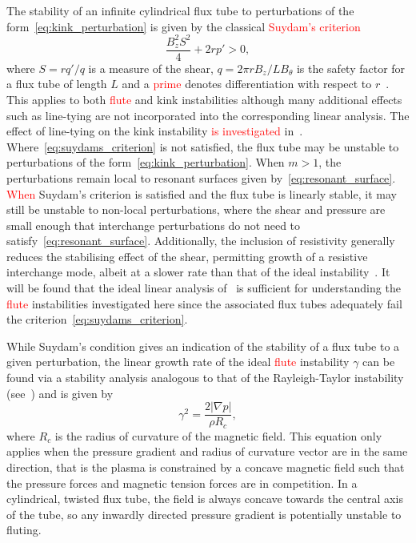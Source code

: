 \documentclass[12pt]{article}
\newcommand{\rs}[2]{\textcolor{red}{#2}}
\begin{document}
The stability of an infinite cylindrical flux tube to perturbations of
the form~\eqref{eq:kink_perturbation} is given by the classical
\rs{}{Suydam's criterion \cite{suydamStabilityLinearPinch1958}}
\begin{equation}
  \label{eq:suydams_criterion}
\frac{B_z^2 S^2}{4} + 2 r p' > 0,
\end{equation}
where $S = r q'/q$ is a measure of the shear, $q = 2\pi r B_z / L
B_{\theta}$ is the safety factor for a flux tube of length $L$ and a
\rs{dash}{prime} denotes differentiation with respect to
$r$~\cite{mikhailovskiiInstabilitiesConfinedPlasma1998}. This applies
to both \rs{fluting}{flute} and kink instabilities although many
additional effects such as line-tying are not incorporated into the
corresponding linear analysis. The effect of line-tying on the kink
instability \rs{can be found}{is investigated}
in~\cite{hoodKinkInstabilitySolar1979}. Where~\eqref{eq:suydams_criterion}
is not satisfied, the flux tube may be unstable to perturbations of
the form~\eqref{eq:kink_perturbation}. When $m>1$, the perturbations
remain local to resonant surfaces given
by~\eqref{eq:resonant_surface}. 
\rs{}{When} Suydam's criterion is satisfied and the flux tube is linearly stable, it may still be unstable to non-local perturbations, where the shear and pressure are small enough that interchange perturbations do not need to satisfy~\eqref{eq:resonant_surface}. Additionally, the inclusion of resistivity generally reduces the stabilising effect of the shear, permitting growth of a resistive interchange mode, albeit at a slower rate than that of the ideal instability~\cite{mikhailovskiiInstabilitiesConfinedPlasma1998}. It will be found that the ideal linear analysis of~\cite{mikhailovskiiInstabilitiesConfinedPlasma1998} is sufficient for understanding the \rs{fluting}{flute} instabilities investigated here since the associated flux tubes adequately fail the criterion~\eqref{eq:suydams_criterion}.

While Suydam's condition gives an indication of the stability of a flux tube to a given perturbation, the linear growth rate of the ideal \rs{fluting}{flute} instability $\gamma$ can be found via a stability analysis analogous to that of the Rayleigh-Taylor instability (see~\cite{goldstonIntroductionPlasmaPhysics2020}) and is given by
\begin{equation}
  \label{eq:fluting_growth_rate}
\gamma^2 = \frac{2|\nabla p|}{\rho R_c},
\end{equation}
where $R_c$ is the radius of curvature of the magnetic field. This equation only applies when the pressure gradient and radius of curvature vector are in the same direction, that is the plasma is constrained by a concave magnetic field such that the pressure forces and magnetic tension forces are in competition. In a cylindrical, twisted flux tube, the field is always concave towards the central axis of the tube, so any inwardly directed pressure gradient is potentially unstable to fluting.
\end{document}
